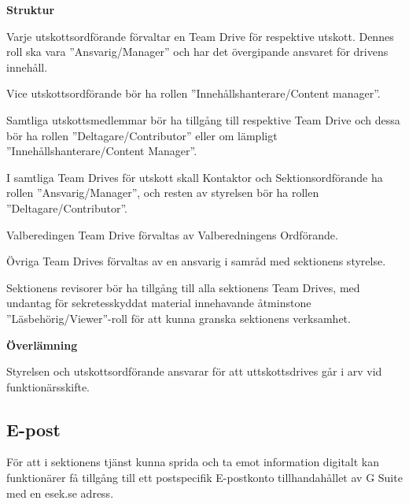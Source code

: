 \documentclass[10pt]{article}
\begin{document}
    \textbf{Struktur}
    \begin{dashlist}

    \item Varje utskottsordförande förvaltar en Team Drive för respektive utskott. Dennes roll ska vara ''Ansvarig/Manager'' och har det övergipande ansvaret för drivens innehåll. 
    
    \item Vice utskottsordförande bör ha rollen ''Innehållshanterare/Content manager''. 

    \item Samtliga utskottsmedlemmar bör ha tillgång till respektive Team Drive och dessa bör ha rollen ''Deltagare/Contributor'' eller om lämpligt ''Innehållshanterare/Content Manager''. 
    
    \item I samtliga Team Drives för utskott skall Kontaktor och Sektionsordförande ha rollen ''Ansvarig/Manager'', och resten av styrelsen bör ha rollen ''Deltagare/Contributor''.
    
    \item Valberedingen Team Drive förvaltas av Valberedningens Ordförande.
    
    \item Övriga Team Drives förvaltas av en ansvarig i samråd med sektionens styrelse. 

    \item Sektionens revisorer bör ha tillgång till alla sektionens Team Drives, med undantag för sekretesskyddat material innehavande åtminstone ''Läsbehörig/Viewer''-roll för att kunna granska sektionens verksamhet. 
     
    \end{dashlist}
    
    \vspace{3px}
    \textbf{Överlämning}

    Styrelsen och utskottsordförande ansvarar för att uttskottsdrives går i arv vid funktionärsskifte.

    \vspace{10px}
    \subsection{E-post}
    \vspace{6px}

    För att i sektionens tjänst kunna sprida och ta emot information digitalt kan funktionärer få tillgång till ett postspecifik E-postkonto tillhandahållet av G Suite med en esek.se adress. 
\end{document}
